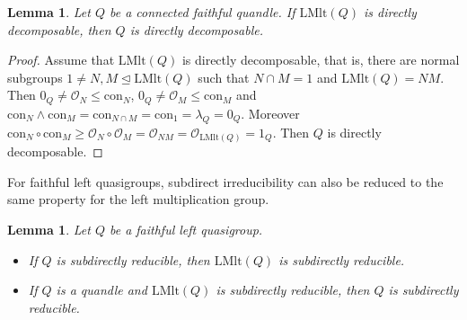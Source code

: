 \documentclass[a4paper, english, 9pt]{amsart}
\theoremstyle{plain}
\newtheorem{lemma}[theorem]{Lemma}
\theoremstyle{definition}
\def\lmlt{\mathrm{LMlt}}
\def\dis{\mathrm{Dis}}
\def\con{\mathrm{Con}}
\def\comment#1{{\color{red} #1}}
\def\c#1{\mathrm{con}_{#1}}
\begin{document}
\begin{lemma}
Let $Q$ be a connected faithful quandle. 
If $\lmlt(Q)$ is directly decomposable, then $Q$ is directly decomposable.  
\end{lemma}

    
\begin{proof}



Assume that $\lmlt(Q)$ is directly decomposable, that is, there are normal subgroups $1 \neq N,M\trianglelefteq\lmlt(Q)$ such that $N\cap M=1$ and $\lmlt(Q)=NM$. Then $0_Q\neq \mathcal{O}_N\leq \c{N}$, $0_Q\neq \mathcal{O}_M\leq \c{M}$ and $\c{N}\wedge\c{M}=\c{N\cap M}=\c{1}= \lambda_Q=0_Q$. Moreover $\c{N}\circ \c{M}\geq \mathcal{O}_N\circ \mathcal{O}_M=\mathcal{O}_{NM}=\mathcal{O}_{\lmlt(Q)}=1_Q$. Then $Q$ is directly decomposable.
\end{proof}

For faithful left quasigroups, subdirect irreducibility can also be reduced to the same property for the left multiplication group.

\begin{lemma}\label{SI LQGs}
Let $Q$ be a faithful left quasigroup. 
\begin{itemize}
    \item[(i)] If $Q$ is subdirectly reducible, then $\lmlt(Q)$ is subdirectly reducible. 
\item[(ii)]  If $Q$ is a quandle and $\lmlt(Q)$ is subdirectly reducible, then $Q$ is subdirectly reducible.
\end{itemize}
\end{lemma}
\end{document}

